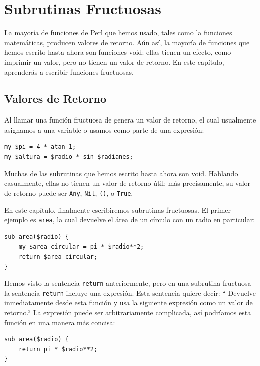 
\chapter{Subrutinas Fructuosas}
\label{fruitchap}

La mayoría de funciones de Perl que hemos usado, tales como
la funciones matemáticas, producen valores de retorno. Aún así,
la mayoría de funciones que hemos escrito hasta ahora son funciones
void: ellas tienen un efecto, como imprimir un valor,
pero no tienen un valor de retorno. En este capítulo, aprenderás
a escribir funciones fructuosas.

\section{Valores de Retorno}

Al llamar una función fructuosa de genera un valor de retorno,
el cual usualmente asignamos a una variable o usamos como 
parte de una expresión:

\begin{lstlisting}
my $pi = 4 * atan 1;
my $altura = $radio * sin $radianes;
\end{lstlisting}
%
Muchas de las subrutinas que hemos escrito hasta ahora son
void. Hablando casualmente, ellas no tienen un valor de 
retorno útil; más precisamente, su valor de retorno puede
ser {\tt Any}, {\tt Nil}, {\tt ()}, o {\tt True}.

En este capítulo, finalmente escribiremos subrutinas fructuosas. 
El primer ejemplo es {\tt area}, la cual devuelve el área de un 
círculo con un radio en particular:

\begin{lstlisting}
sub area($radio) {
    my $area_circular = pi * $radio**2;
    return $area_circular;
}
\end{lstlisting}
%
Hemos visto la sentencia {\tt return} anteriormente,
pero en una subrutina fructuosa la sentencia {\tt return} 
incluye una expresión. Esta sentencia quiere decir: ``
Devuelve inmediatamente desde esta función y usa la siguiente
expresión como un valor de retorno.``
La expresión puede ser arbitrariamente complicada, así podríamos
esta función en una manera más concisa:

\begin{lstlisting}
sub area($radio) {
    return pi * $radio**2;
}
\end{lstlisting}
%

